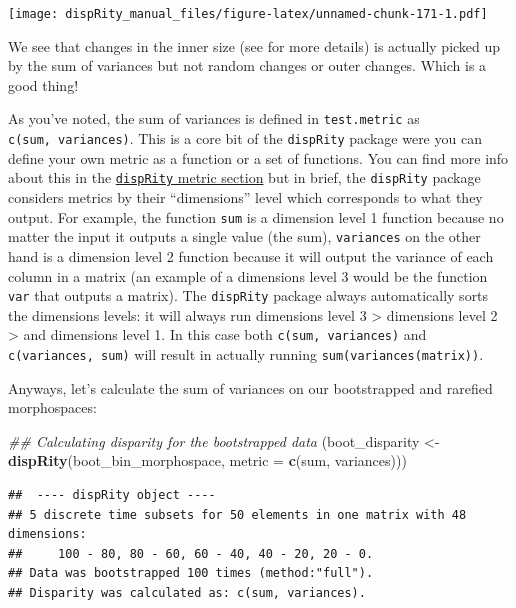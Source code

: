 \documentclass[]{book}
\newenvironment{Shaded}{\begin{snugshade}}{\end{snugshade}}
\newcommand{\CommentTok}[1]{\textcolor[rgb]{0.56,0.35,0.01}{\textit{#1}}}
\newcommand{\DataTypeTok}[1]{\textcolor[rgb]{0.13,0.29,0.53}{#1}}
\newcommand{\KeywordTok}[1]{\textcolor[rgb]{0.13,0.29,0.53}{\textbf{#1}}}
\newcommand{\NormalTok}[1]{#1}
\newcommand{\StringTok}[1]{\textcolor[rgb]{0.31,0.60,0.02}{#1}}
\begin{document}
\texttt{[image: dispRity\_manual\_files/figure-latex/unnamed-chunk-171-1.pdf]}

We see that changes in the inner size (see \citet{moms} for more details) is actually picked up by the sum of variances but not random changes or outer changes. Which is a good thing!

As you've noted, the sum of variances is defined in \texttt{test.metric} as \texttt{c(sum,\ variances)}. This is a core bit of the \texttt{dispRity} package were you can define your own metric as a function or a set of functions.
You can find more info about this in the \protect\hyperlink{disparity-metrics}{\texttt{dispRity} metric section} but in brief, the \texttt{dispRity} package considers metrics by their ``dimensions'' level which corresponds to what they output. For example, the function \texttt{sum} is a dimension level 1 function because no matter the input it outputs a single value (the sum), \texttt{variances} on the other hand is a dimension level 2 function because it will output the variance of each column in a matrix (an example of a dimensions level 3 would be the function \texttt{var} that outputs a matrix).
The \texttt{dispRity} package always automatically sorts the dimensions levels: it will always run dimensions level 3 \textgreater{} dimensions level 2 \textgreater{} and dimensions level 1. In this case both \texttt{c(sum,\ variances)} and \texttt{c(variances,\ sum)} will result in actually running \texttt{sum(variances(matrix))}.

Anyways, let's calculate the sum of variances on our bootstrapped and rarefied morphospaces:

\begin{Shaded}
\begin{Highlighting}[]
\CommentTok{## Calculating disparity for the bootstrapped data}
\NormalTok{(boot_disparity <-}\StringTok{ }\KeywordTok{dispRity}\NormalTok{(boot_bin_morphospace, }\DataTypeTok{metric =} \KeywordTok{c}\NormalTok{(sum, variances)))}
\end{Highlighting}
\end{Shaded}

\begin{verbatim}
##  ---- dispRity object ---- 
## 5 discrete time subsets for 50 elements in one matrix with 48 dimensions:
##     100 - 80, 80 - 60, 60 - 40, 40 - 20, 20 - 0.
## Data was bootstrapped 100 times (method:"full").
## Disparity was calculated as: c(sum, variances).
\end{verbatim}
\end{document}
